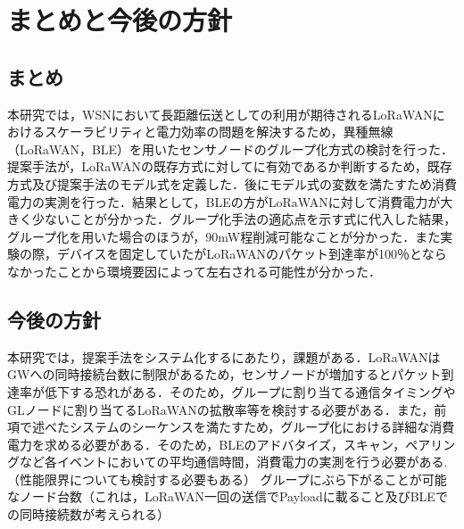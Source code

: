 \chapter{まとめと今後の方針}
\section{まとめ}
本研究では，WSNにおいて長距離伝送としての利用が期待されるLoRaWANにおけるスケーラビリティと電力効率の問題を解決するため，異種無線（LoRaWAN，BLE）を用いたセンサノードのグループ化方式の検討を行った．提案手法が，LoRaWANの既存方式に対してに有効であるか判断するため，既存方式及び提案手法のモデル式を定義した．後にモデル式の変数を満たすため消費電力の実測を行った．結果として，BLEの方がLoRaWANに対して消費電力が大きく少ないことが分かった．グループ化手法の適応点を示す式に代入した結果，グループ化を用いた場合のほうが，90mW程削減可能なことが分かった．また実験の際，デバイスを固定していたがLoRaWANのパケット到達率が100％とならなかったことから環境要因によって左右される可能性が分かった．
\par

\section{今後の方針}
本研究では，提案手法をシステム化するにあたり，課題がある．LoRaWANはGWへの同時接続台数に制限があるため，センサノードが増加するとパケット到達率が低下する恐れがある．そのため，グループに割り当てる通信タイミングやGLノードに割り当てるLoRaWANの拡散率等を検討する必要がある．また，前項で述べたシステムのシーケンスを満たすため，グループ化における詳細な消費電力を求める必要がある．そのため，BLEのアドバタイズ，スキャン，ペアリングなど各イベントにおいての平均通信時間，消費電力の実測を行う必要がある.
（性能限界についても検討する必要もある）
グループにぶら下がることが可能なノード台数（これは，LoRaWAN一回の送信でPayloadに載ること及びBLEでの同時接続数が考えられる）